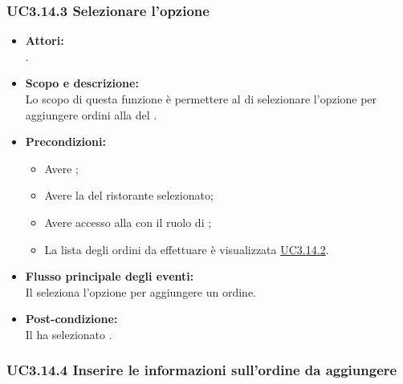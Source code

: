 \subsubsection{UC3.14.3 Selezionare l'opzione } \label{UC3.14.3}

\begin{itemize}
	\item \textbf{Attori:}
	\\.
	\item \textbf{Scopo e descrizione:} 
	\\Lo scopo di questa funzione è permettere al  di selezionare l'opzione per aggiungere ordini alla  del .
	\item \textbf{Precondizioni:}
	\begin{itemize}
		\item Avere ;
		\item Avere la  del ristorante selezionato;
		\item Avere accesso alla  con il ruolo di ;
		\item La lista degli ordini da effettuare è visualizzata \hyperref[UC3.14.2]{UC3.14.2}.
	\end{itemize}
	\item \textbf{Flusso principale degli eventi:}
	\\Il {} seleziona l'opzione per aggiungere un ordine.
	\item \textbf{Post-condizione:}
	\\Il {} ha selezionato .
\end{itemize}

\subsubsection{UC3.14.4 Inserire le informazioni sull'ordine da aggiungere} \label{UC3.14.4}

